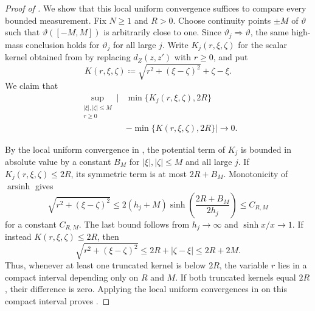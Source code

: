 \documentclass{amsart}
\numberwithin{equation}{section}
\theoremstyle{plain}
\theoremstyle{definition}
\theoremstyle{remark}
\DeclareMathOperator{\arsinh}{arsinh}
\begin{document}
\begin{proof}[Proof of ]
We show that this local uniform convergence suffices to compare every bounded measurement.  Fix $N\ge1$ and $R>0$.
Choose continuity points $\pm M$ of $\vartheta$ such that $\vartheta([-M,M])$ is arbitrarily close to one.  Since
$\vartheta_j\Rightarrow\vartheta$, the same high-mass conclusion holds for $\vartheta_j$ for all large $j$.  Write
$K_j(r,\xi,\zeta)$ for the scalar kernel obtained from  by replacing
$d_Z(z,z')$ with $r\ge0$, and put
\[
 K(r,\xi,\zeta)\coloneqq\sqrt{r^2+(\xi-\zeta)^2}+\zeta-\xi.
\]
We claim that
\begin{equation}\label{eq:tangent-truncated-uniform}
\begin{split}
 \sup_{\substack{|\xi|,|\zeta|\le M\\r\ge0}}
 \bigl|&\min\{K_j(r,\xi,\zeta),2R\}\\
       &-\min\{K(r,\xi,\zeta),2R\}\bigr|
 \longrightarrow0.
\end{split}
\end{equation}

By the local uniform convergence in , the potential term of $K_j$ is bounded in absolute
value by a constant $B_M$ for $|\xi|,|\zeta|\le M$ and all large $j$.  If $K_j(r,\xi,\zeta)\le2R$, its symmetric term is at
most $2R+B_M$.
Monotonicity of $\arsinh$ gives
\[
 \sqrt{r^2+(\xi-\zeta)^2}
 \le2(h_j+M)\sinh\left(\frac{2R+B_M}{2h_j}\right)
 \le C_{R,M}
\]
for a constant $C_{R,M}$.  The last bound follows from $h_j\to\infty$ and $\sinh x/x\to1$.  If instead
$K(r,\xi,\zeta)\le2R$, then
\[
 \sqrt{r^2+(\xi-\zeta)^2}
 \le2R+|\zeta-\xi|\le2R+2M.
\]
Thus, whenever at least one truncated kernel is below $2R$, the variable $r$ lies in a compact interval depending only on
$R$ and $M$.  If both truncated kernels equal $2R$, their difference is zero.  Applying the local uniform convergences in
 on this compact interval proves
.


\end{proof}
\end{document}
